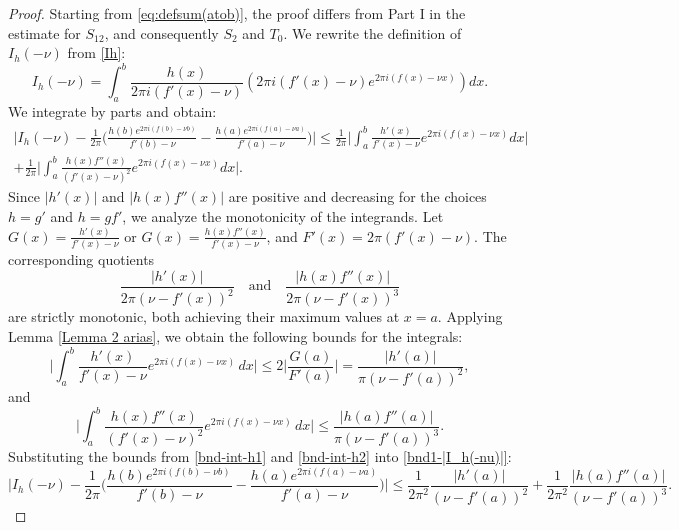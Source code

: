 \documentclass[11pt,letterpaper,oneside,reqno]{amsart}
\renewcommand{\^}[1]{\widehat{#1}}
\numberwithin{equation}{section}
\theoremstyle{remark}
\begin{document}
\begin{proof}
Starting from \eqref{eq:defsum(atob)}, the proof differs from Part I in the estimate for $S_{12}$, and consequently $S_2$ and $T_0$. We rewrite the definition of $I_h(-\nu)$ from \eqref{Ih}:
\begin{equation}
     I_{h}(-\nu)
    =\int_a^b \frac{h(x)}{2\pi i(f'(x)-\nu)} \left(2\pi i(f'(x)-\nu) e^{2\pi i \left(f(x)-\nu x\right)}\right)dx.
\end{equation}
We integrate by parts and obtain:
\begin{multline}
    \bigg| I_h(-\nu) -\frac{1}{2\pi}   \bigg( \frac{h(b) e^{2 \pi i (f(b) - \nu b)}}{f'(b) - \nu} - \frac{h(a) e^{2 \pi i (f(a) - \nu a)}}{f'(a) - \nu}\bigg) \bigg| \leq \frac{1}{2\pi} \bigg|  \int_a^b \frac{h'(x)}{f'(x) - \nu} e^{2\pi i (f(x) - \nu x)} dx \bigg|  \\+ \frac{1}{2\pi} \bigg|  \int_a^b \frac{h(x)f''(x)}{(f'(x) - \nu)^2} e^{2\pi i (f(x) - \nu x)} dx \bigg| \label{bnd1-|I_h(-nu)|}.
\end{multline}
%
Since $|h'(x)|$ and $|h(x)f''(x)|$ are positive and decreasing for the choices $h=g'$ and $h=gf'$, we analyze the monotonicity of the integrands. Let $G(x)=\frac{h'(x)}{f'(x)-\nu}$ or $G(x)=\frac{h(x)f''(x)}{f'(x)-\nu}$, and $F'(x)=2\pi(f'(x)-\nu)$. The corresponding quotients 
\begin{equation*}
    \frac{|h'(x)|}{2\pi(\nu-f'(x))^2} \quad \text{and} \quad \frac{|h(x)f''(x)|}{2\pi(\nu-f'(x))^3}
\end{equation*}
are strictly monotonic, both achieving their maximum values at $x=a$.
%
Applying Lemma \ref{Lemma 2 arias}, we obtain the following bounds for the integrals:
\begin{equation}
\label{bnd-int-h1}
     \bigg|  \int_a^b \frac{h'(x)}{f'(x)-\nu} e^{2\pi i \left(f(x)-\nu x\right)}\,dx \bigg|  \leq 2 \bigg| \frac{G(a)}{F'(a)}\bigg|  = \frac{|h'(a)|}{\pi(\nu-f'(a))^2},
\end{equation}
and
\begin{equation}
\label{bnd-int-h2}
     \bigg|  \int_a^b \frac{h(x)f''(x)}{(f'(x)-\nu)^2} e^{2\pi i \left(f(x)-\nu x\right)}\,dx \bigg|  \leq  \frac{|h(a)f''(a)|}{\pi(\nu-f'(a))^3}.
\end{equation}
% 
%
Substituting the bounds from \eqref{bnd-int-h1} and \eqref{bnd-int-h2} into \eqref{bnd1-|I_h(-nu)|}:
\begin{equation}
    \bigg| I_h(-\nu) -\frac{1}{2\pi} \bigg( \frac{h(b) e^{2 \pi i (f(b) - \nu b)}}{f'(b) - \nu} - \frac{h(a) e^{2 \pi i (f(a) - \nu a)}}{f'(a) - \nu}\bigg)\bigg|  \leq \frac{1}{2\pi^2} \frac{|h'(a)|}{(\nu-f'(a))^2}+ \frac{1}{2\pi^2} \frac{|h(a)f''(a)|}{(\nu-f'(a))^3} .\label{final-bnd-|I_h(-nu)|}

\end{equation}
\end{proof}
\end{document}
